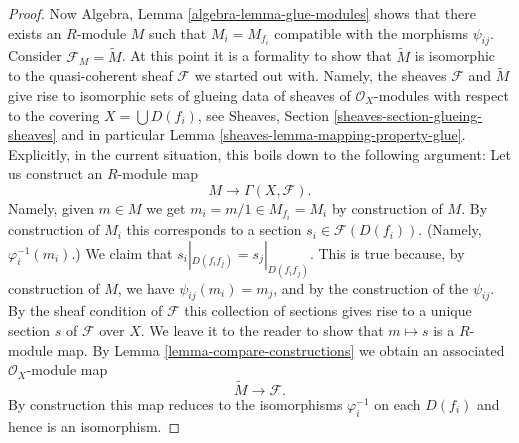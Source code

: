 \begin{proof}
\medskip\noindent
Now Algebra, Lemma \ref{algebra-lemma-glue-modules}
shows that there exists an $R$-module $M$ such that
$M_i = M_{f_i}$ compatible with the morphisms $\psi_{ij}$.
Consider $\mathcal{F}_M = \widetilde M$. At this point it is
a formality to show that $\widetilde M$ is isomorphic to
the quasi-coherent sheaf $\mathcal{F}$ we started out with.
Namely, the sheaves $\mathcal{F}$ and $\widetilde M$ give
rise to isomorphic sets of glueing data of sheaves of $\mathcal{O}_X$-modules
with respect to the covering $X = \bigcup D(f_i)$, see
Sheaves, Section \ref{sheaves-section-glueing-sheaves}
and in particular Lemma \ref{sheaves-lemma-mapping-property-glue}.
Explicitly, in the current situation, this boils down to
the following argument: Let us construct an $R$-module map
$$
M \longrightarrow \Gamma(X, \mathcal{F}).
$$
Namely, given $m \in M$ we get $m_i = m/1 \in M_{f_i} = M_i$
by construction of $M$. By construction of $M_i$ this corresponds
to a section $s_i \in \mathcal{F}(D(f_i))$. (Namely, $\varphi^{-1}_i(m_i)$.)
We claim that $s_i|_{D(f_if_j)} = s_j|_{D(f_if_j)}$. This is
true because, by construction of $M$, we have $\psi_{ij}(m_i) = m_j$,
and by the construction of the $\psi_{ij}$. By the sheaf condition of
$\mathcal{F}$ this collection of sections gives rise to a unique
section $s$ of $\mathcal{F}$ over $X$. We leave it to the reader
to show that $m \mapsto s$ is a $R$-module map.
By Lemma \ref{lemma-compare-constructions} we obtain an associated
$\mathcal{O}_X$-module map
$$
\widetilde M \longrightarrow \mathcal{F}.
$$
By construction this map reduces to the isomorphisms
$\varphi_i^{-1}$ on each $D(f_i)$ and hence is an isomorphism.
\end{proof}

